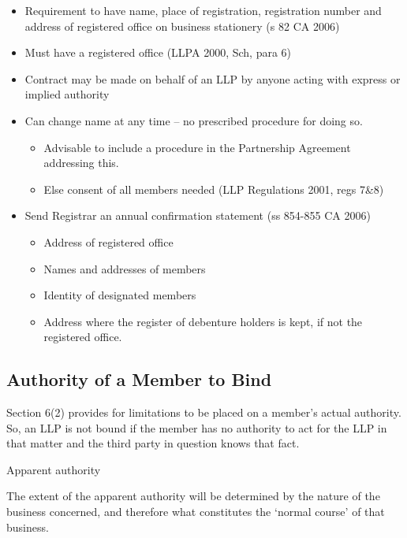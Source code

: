 \documentclass[
]{article}
\providecommand{\tightlist}{%
  \setlength{\itemsep}{0pt}\setlength{\parskip}{0pt}}
\newenvironment{env-62bef683-3874-4e2f-ba96-0dade4018fd1}
{
    \savenotes\tcolorbox[blanker,breakable,left=5pt,borderline west={2pt}{-4pt}{gray}]
}
{
    \endtcolorbox\spewnotes
}
\begin{document}
\begin{itemize}
\tightlist
\item
  Requirement to have name, place of registration, registration number
  and address of registered office on business stationery (s 82 CA 2006)
\item
  Must have a registered office (LLPA 2000, Sch, para 6)
\item
  Contract may be made on behalf of an LLP by anyone acting with express
  or implied authority
\item
  Can change name at any time -- no prescribed procedure for doing so.

  \begin{itemize}
  \tightlist
  \item
    Advisable to include a procedure in the Partnership Agreement
    addressing this.
  \item
    Else consent of all members needed (LLP Regulations 2001, regs 7\&8)
  \end{itemize}
\item
  Send Registrar an annual confirmation statement (ss 854-855 CA 2006)

  \begin{itemize}
  \tightlist
  \item
    Address of registered office
  \item
    Names and addresses of members
  \item
    Identity of designated members
  \item
    Address where the register of debenture holders is kept, if not the
    registered office.
  \end{itemize}
\end{itemize}

\hypertarget{authority-of-a-member-to-bind}{%
\subsection{Authority of a Member to
Bind}\label{authority-of-a-member-to-bind}}

Section 6(2) provides for limitations to be placed on a member's actual
authority. So, an LLP is not bound if the member has no authority to act
for the LLP in that matter and the third party in question knows that
fact.

\begin{env-62bef683-3874-4e2f-ba96-0dade4018fd1}

Apparent authority

The extent of the apparent authority will be determined by the nature of
the business concerned, and therefore what constitutes the `normal
course' of that business.

\end{env-62bef683-3874-4e2f-ba96-0dade4018fd1}
\end{document}
